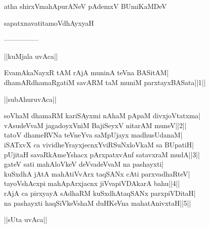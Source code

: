 \documentclass{article}
\begin{document}
\begin{center}
atha shirxVmahApurANeV pAdemxV BUmiKaMDeV
\end{center}

\begin{center}
sapatxnavatitamoVdhAyxyaH
\end{center}

\begin{center}
---------------
\end{center}

\begin{center}
||kuMjala uvAca||
\end{center}

EvamAkaNayxR tAM rAjA muninA teVna BASitAM|\\
dhamARdhamaRgatiM savARM taM muniM parxtayxBASata||1||\\

\begin{center}
||subAhuruvAca||
\end{center}

soVhaM dhamaRM kariSAyxmi nAhaM pApaM divxjoVtatxma|\\
vAsudeVvaM jagadoyxVniM BajiSeyxV nitarAM muneV||2||\\
tatoV dhameRVNa teVneYva saMpUjayx madhusUdanaM|\\
iSATxvX ca vividheYrayxjecnxYviRSuNxloVkaM sa BUpatiH|\\
pUjitaH savaRkAmeYshacx pArxpatxvAnf satavxraM mudA||3||\\
gateV sati mahAloVkeV deVvadeVvaM na pashayxti|\\
kuSxdhA jAtA mahAtiVvArx taqSANx cAti parxvadhaRteV|\\
tayoVshAcxpi mahApArxjacnx jiVvapiVDAkarA bahu||4||\\
rAjA ca pirxyayA sAdhaRM kuSxdhAtaqSANx parxpiVDitaH|\\
na pashayxti haqSiVkeVshaM duHKeVna mahatAnivxtaH||5||\\

\begin{center}
||sUta uvAca||
\end{center}
\end{document}

